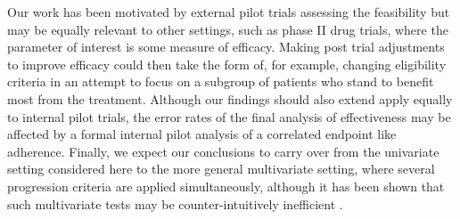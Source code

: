 \documentclass{bmcart}
\begin{document}
Our work has been motivated by external pilot trials assessing the feasibility but may be equally relevant to other settings, such as phase II drug trials, where the parameter of interest is some measure of efficacy. Making post trial adjustments to improve efficacy could then take the form of, for example, changing eligibility criteria in an attempt to focus on a subgroup of patients who stand to benefit most from the treatment. Although our findings should also extend apply equally to internal  pilot trials, the error rates of the final analysis of effectiveness may be affected by a formal internal pilot analysis of a correlated endpoint like adherence. Finally, we expect our conclusions to carry over from the univariate setting considered here to the more general multivariate setting, where several progression criteria are applied simultaneously, although it has been shown that such multivariate tests may be counter-intuitively inefficient \cite{Wilson2021a}.

\end{document}
